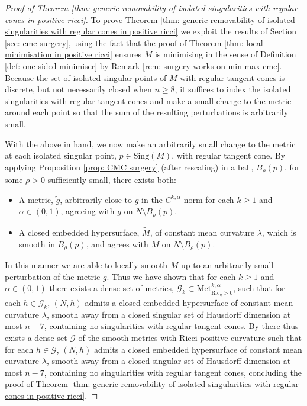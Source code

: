 \documentclass[11pt]{article}
\begin{document}
\begin{proof}[Proof of Theorem \ref{thm: generic removability of isolated singularities with regular cones in positive ricci}]
To prove Theorem \ref{thm: generic removability of isolated singularities with regular cones in positive ricci} we exploit the results of Section \ref{sec: cmc surgery}, using the fact that the proof of Theorem \ref{thm: local minimisation in positive ricci} ensures $M$ is minimising in the sense of Definition \ref{def: one-sided minimiser} by Remark \ref{rem: surgery works on min-max cmc}. Because the set of isolated singular points of $M$ with regular tangent cones is discrete, but not necessarily closed when $n \geq 8$, it suffices to index the isolated singularities with regular tangent cones and make a small change to the metric around each point so that the sum of the resulting perturbations is arbitrarily small.

\bigskip

With the above in hand, we now make an arbitrarily small change to the metric at each isolated singular point, $p \in \mathrm{Sing}(M)$, with regular tangent cone. By applying Proposition \ref{prop: CMC surgery} (after rescaling) in a ball, $B_{\rho}(p)$, for some $\rho > 0$ sufficiently small, there exists both:
\begin{itemize}
    \item A metric, $\tilde{g}$, arbitrarily close to $g$ in the $C^{k,\alpha}$ norm for each $k \geq 1$ and $\alpha \in (0,1)$, agreeing with $g$ on $N \setminus B_{\rho}(p)$.

    \item A closed embedded hypersurface, $\widetilde{M}$, of constant mean curvature $\lambda$, which is smooth in $B_{\rho}(p)$, and agrees with $M$ on $N \setminus B_{\rho}(p)$.
\end{itemize}
In this manner we are able to locally smooth $M$ up to an arbitrarily small perturbation of the metric $g$. Thus we have shown that for each $k \geq 1$ and $\alpha \in (0,1)$ there exists a dense set of metrics, $\mathcal{G}_k \subset \text{Met}^{k,\alpha}_{\mathrm{Ric}_g > 0}$, such that for each $h \in \mathcal{G}_k$, $(N,h)$ admits a closed embedded hypersurface of constant mean curvature $\lambda$, smooth away from a closed singular set of Hausdorff dimension at most $n-7$, containing no singularities with regular tangent cones. By \cite[Theorem 2.10]{White2015} there thus exists a dense set $\mathcal{G}$ of the smooth metrics with Ricci positive curvature such that for each $h \in \mathcal{G}$, $(N,h)$ admits a closed embedded hypersurface of constant mean curvature $\lambda$, smooth away from a closed singular set of Hausdorff dimension at most $n-7$, containing no singularities with regular tangent cones, concluding the proof of Theorem \ref{thm: generic removability of isolated singularities with regular cones in positive ricci}.
\end{proof}
\end{document}
